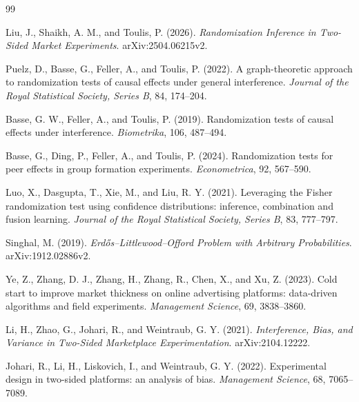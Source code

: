 \documentclass{article}
\begin{document}
\begin{thebibliography}{99}

   Liu, J., Shaikh, A. M., and Toulis, P. (2026). \emph{Randomization Inference in Two-Sided Market Experiments}. arXiv:2504.06215v2.

   Puelz, D., Basse, G., Feller, A., and Toulis, P. (2022). A graph-theoretic approach to randomization tests of causal effects under general interference. \emph{Journal of the Royal Statistical Society, Series B}, 84, 174--204.

   Basse, G. W., Feller, A., and Toulis, P. (2019). Randomization tests of causal effects under interference. \emph{Biometrika}, 106, 487--494.

   Basse, G., Ding, P., Feller, A., and Toulis, P. (2024). Randomization tests for peer effects in group formation experiments. \emph{Econometrica}, 92, 567--590.

   Luo, X., Dasgupta, T., Xie, M., and Liu, R. Y. (2021). Leveraging the Fisher randomization test using confidence distributions: inference, combination and fusion learning. \emph{Journal of the Royal Statistical Society, Series B}, 83, 777--797.

   Singhal, M. (2019). \emph{Erd\H{o}s--Littlewood--Offord Problem with Arbitrary Probabilities}. arXiv:1912.02886v2.

   Ye, Z., Zhang, D. J., Zhang, H., Zhang, R., Chen, X., and Xu, Z. (2023). Cold start to improve market thickness on online advertising platforms: data-driven algorithms and field experiments. \emph{Management Science}, 69, 3838--3860.

   Li, H., Zhao, G., Johari, R., and Weintraub, G. Y. (2021). \emph{Interference, Bias, and Variance in Two-Sided Marketplace Experimentation}. arXiv:2104.12222.

   Johari, R., Li, H., Liskovich, I., and Weintraub, G. Y. (2022). Experimental design in two-sided platforms: an analysis of bias. \emph{Management Science}, 68, 7065--7089.

\end{thebibliography}
\end{document}
